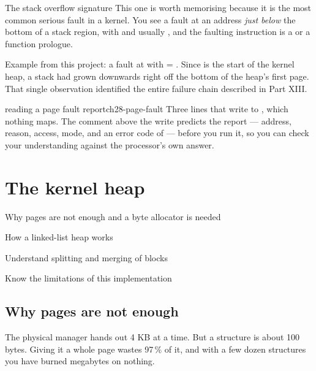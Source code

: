 \begin{concept}{The stack overflow signature}
This one is worth memorising because it is the most common serious fault in a kernel. You see a
fault at an address \emph{just below} the bottom of a stack region, with  and
usually , and the faulting instruction is a  or a function prologue.

Example from this project: a fault at  with  = . Since
 is the start of the kernel heap, a stack had grown downwards right off the bottom of
the heap's first page. That single observation identified the entire failure chain described in
Part XIII.
\end{concept}

\begin{recipe}{reading a page fault report}{ch28-page-fault}
Three lines that write to , which nothing maps. The comment above the write predicts
the report --- address, reason, access, mode, and an error code of  --- before you run it,
so you can check your understanding against the processor's own answer.
\end{recipe}

\chapter{The kernel heap}

\begin{goals}
  \item Why pages are not enough and a byte allocator is needed
  \item How a linked-list heap works
  \item Understand splitting and merging of blocks
  \item Know the limitations of this implementation
\end{goals}

\section{Why pages are not enough}

The physical manager hands out 4 KB at a time. But a  structure is about 100 bytes.
Giving it a whole page wastes 97\,\% of it, and with a few dozen structures you have burned megabytes
on nothing.

